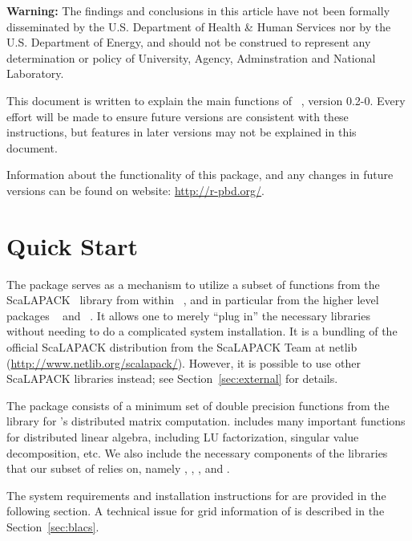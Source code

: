 {\color{red} \bf Warning:}
The findings and conclusions in this article have not been
formally disseminated by the U.S. Department of Health \& Human Services
nor by the U.S. Department of Energy,
and should not be construed to represent any determination or
policy of University, Agency, Adminstration and National Laboratory.

This document is written to explain the main
functions of ~\citep{Chen2012pbdSLAPpackage}, version 0.2-0.
Every effort will be made to ensure future versions are consistent with
these instructions, but features in later versions may not be explained
in this document.

Information about the functionality of this package,
and any changes in future versions can be found on website:
\url{http://r-pbd.org/}.



\section[Quick Start]{Quick Start}
\label{sec:quick_start}

The  package serves as a mechanism to utilize a subset of
functions from the ScaLAPACK~\citep{ScaLAPACK1997} library from within
~\citep{Rcore}, and in particular from the higher level
 packages ~\citep{Schmidt2012pbdBASEpackage} and
~\citep{Schmidt2012pbdDMATpackage}. It allows one to merely
``plug in'' the necessary libraries without needing to do a complicated
system installation.  It is a bundling of the official ScaLAPACK distribution
from the ScaLAPACK Team at netlib (\url{http://www.netlib.org/scalapack/}).
However, it is possible to use other ScaLAPACK libraries instead; see
Section~\ref{sec:external} for details.

The  package consists of a minimum set of double precision
functions from the  library
for 's distributed matrix computation. 
includes many important functions for distributed linear algebra, including
LU factorization, singular value decomposition, etc.
We also include the necessary components of the libraries that our subset of
 relies on, namely ,
, , and .  

The system requirements and installation instructions for  are
provided in the following section.
A technical issue for grid information of  is described in
the Section~\ref{sec:blacs}.


